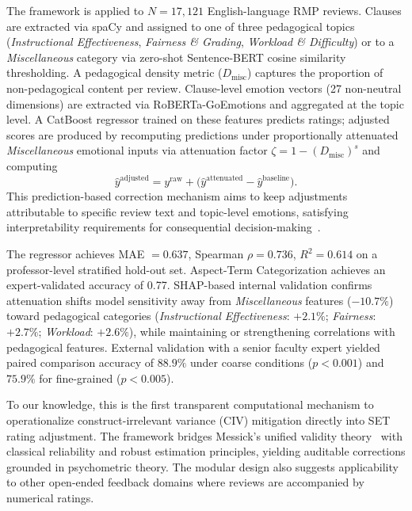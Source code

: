\documentclass[11pt]{article}
\begin{document}
The framework is applied to $N = 17{,}121$ English-language RMP reviews. Clauses are
extracted via spaCy and assigned to one of three pedagogical topics (\textit{Instructional
Effectiveness}, \textit{Fairness \& Grading}, \textit{Workload \& Difficulty}) or to a
\textit{Miscellaneous} category via zero-shot Sentence-BERT cosine similarity thresholding.
A pedagogical density metric ($D_\mathrm{misc}$) captures the proportion of non-pedagogical content per review. Clause-level emotion vectors
(27 non-neutral dimensions) are extracted via RoBERTa-GoEmotions and aggregated at the topic level.
A CatBoost regressor trained on these features predicts ratings; adjusted scores are produced by recomputing predictions under proportionally attenuated \textit{Miscellaneous} emotional inputs via attenuation factor
$\zeta = 1 - (D_{\mathrm{misc}})^{s}$ and computing
\begin{equation}
  \hat{y}^{\mathrm{adjusted}} = y^{\mathrm{raw}} + \bigl(\hat{y}^{\mathrm{attenuated}} - \hat{y}^{\mathrm{baseline}}\bigr). \label{eq1}
\end{equation}
This prediction-based correction mechanism aims to keep adjustments attributable to specific review text and topic-level emotions, satisfying interpretability requirements for consequential decision-making~\cite{DK17}.

The regressor achieves MAE $= 0.637$, Spearman $\rho = 0.736$, $R^2 = 0.614$ on a
professor-level stratified hold-out set. Aspect-Term Categorization achieves an expert-validated accuracy of 0.77. SHAP-based internal validation
confirms attenuation shifts model sensitivity away from \textit{Miscellaneous} features ($-10.7\%$) toward
pedagogical categories (\textit{Instructional Effectiveness}: $+2.1\%$; \textit{Fairness}: $+2.7\%$; \textit{Workload}:
$+2.6\%$), while maintaining or strengthening correlations with pedagogical features.
External validation with a senior faculty expert yielded paired comparison accuracy of
$88.9\%$ under coarse conditions ($p < 0.001$) and $75.9\%$ for fine-grained ($p < 0.005$).

To our knowledge, this is the first transparent computational mechanism to operationalize
construct-irrelevant variance (CIV) mitigation directly into SET rating adjustment. The framework bridges Messick's unified
validity theory~\cite{M95} with classical reliability and robust estimation principles,
yielding auditable corrections grounded in psychometric theory. The modular design also
suggests applicability to other open-ended feedback domains where reviews are accompanied by numerical ratings.
\end{document}
